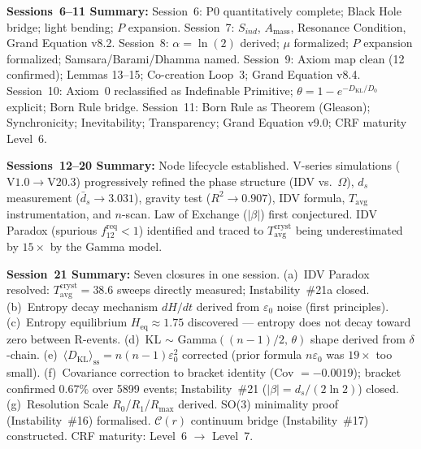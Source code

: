 \documentclass[12pt, a4paper]{article}
\begin{document}
\textbf{Sessions~6--11 Summary:} Session~6: P0 quantitatively complete; Black Hole bridge;
light bending; $P$ expansion. Session~7: $S_{ind}$, $A_{\mathrm{mass}}$, Resonance Condition,
Grand Equation v8.2. Session~8: $\alpha = \ln(2)$ derived; $\mu$ formalized; $P$ expansion
formalized; Samsara/Barami/Dhamma named. Session~9: Axiom map clean (12 confirmed); Lemmas
13--15; Co-creation Loop~3; Grand Equation v8.4. Session~10: Axiom~0 reclassified as
Indefinable Primitive; $\theta = 1 - e^{-D_{\mathrm{KL}}/D_0}$ explicit; Born Rule bridge.
Session~11: Born Rule as Theorem (Gleason); Synchronicity; Inevitability; Transparency;
Grand Equation v9.0; CRF maturity Level~6.

\textbf{Sessions~12--20 Summary:} Node lifecycle established. V-series simulations
($\mathrm{V1.0} \to \mathrm{V20.3}$) progressively refined the phase structure (IDV
vs.\ $\Omega$), $d_s$ measurement ($\bar{d}_s \to 3.031$), gravity test ($R^2 \to 0.907$),
IDV formula, $T_{\mathrm{avg}}$ instrumentation, and $n$-scan. Law of Exchange ($|\beta|$)
first conjectured. IDV Paradox (spurious $f_{12}^{\mathrm{req}} < 1$) identified and traced
to $T_{\mathrm{avg}}^{\mathrm{cryst}}$ being underestimated by $15\times$ by the Gamma model.

\textbf{Session~21 Summary:} Seven closures in one session. (a)~IDV Paradox resolved:
$T_{\mathrm{avg}}^{\mathrm{cryst}} = 38.6$ sweeps directly measured; Instability~\#21a
closed. (b)~Entropy decay mechanism $dH/dt$ derived from $\varepsilon_0$ noise (first
principles). (c)~Entropy equilibrium $H_{\mathrm{eq}} \approx 1.75$ discovered --- entropy
does not decay toward zero between R-events. (d)~KL $\sim$ Gamma$((n-1)/2,\,\theta)$
shape derived from $\delta$-chain. (e)~$\langle D_{\mathrm{KL}}\rangle_{\mathrm{ss}} =
n(n-1)\varepsilon_0^2$ corrected (prior formula $n\varepsilon_0$ was $19\times$ too
small). (f)~Covariance correction to bracket identity (Cov $= -0.0019$); bracket confirmed
0.67\% over 5899 events; Instability~\#21 ($|\beta| = d_s/(2\ln 2)$) closed. (g)~Resolution
Scale $R_0$/$R_1$/$R_{\max}$ derived. SO(3) minimality proof (Instability~\#16) formalised.
$\mathcal{C}(r)$ continuum bridge (Instability~\#17) constructed. CRF maturity:
Level~6 $\to$ Level~7.
\end{document}
